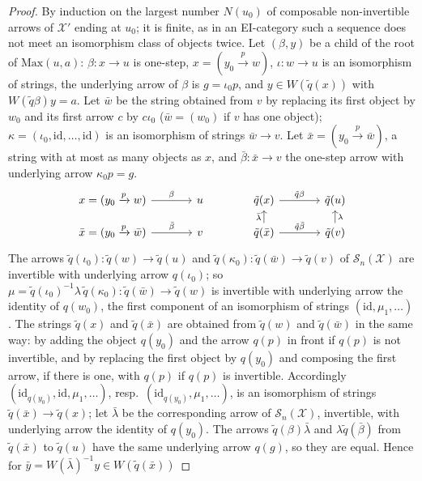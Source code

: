 \documentclass[11pt]{amsart}
\theoremstyle{definition}
\newcommand{\Max}{\mathrm{Max}}
\newcommand{\cX}{\mathcal X}
\newcommand{\cS}{\mathcal S}
\newcommand{\id}{\mathrm{id}}
\begin{document}
\begin{proof}
By induction on the largest number $N(u_0)$ of composable
non-invertible arrows of $\cX'$ ending at $u_0$; it is finite, as in
an EI-category such a sequence does not meet an isomorphism class of
objects twice. Let $(\beta,y)$ be a child of the root of $\Max(u,a)$:
$\beta\colon x\to u$ is one-step, $x=(y_0\xrightarrow{p}w)$,
$\iota\colon w\to u$ is an isomorphism of strings, the underlying
arrow of $\beta$ is $g=\iota_0p$, and $y\in W(\tilde q(x))$ with
$W(\tilde q\beta)y=a$. Let $\bar w$ be the string obtained from $v$ by
replacing its first object by $w_0$ and its first arrow $c$ by
$c\iota_0$ ($\bar w=(w_0)$ if $v$ has one object);
$\kappa=(\iota_0,\id,\dots,\id)$ is an isomorphism of strings $\bar
w\to v$. Let $\bar x=(y_0\xrightarrow{p}\bar w)$, a string with at
most as many objects as $x$, and $\bar\beta\colon\bar x\to v$ the
one-step arrow with underlying arrow $\kappa_0p=g$.
\[
\begin{tikzcd}[column sep=large,row sep=small]
x=(y_0\xrightarrow{p}w)\ar[r,"\beta"]&u&\tilde q(x)\ar[r,"\tilde
q\beta"]&\tilde q(u)\\
\bar x=(y_0\xrightarrow{p}\bar w)\ar[r,"\bar\beta"]&v&\tilde q(\bar
x)\ar[r,"\tilde q\bar\beta"]\ar[u,"\bar\lambda"]&\tilde
q(v)\ar[u,"\lambda"']
\end{tikzcd}
\]
The arrows $\tilde q(\iota_0)\colon\tilde q(w)\to\tilde q(u)$ and
$\tilde q(\kappa_0)\colon\tilde q(\bar w)\to\tilde q(v)$ of
$\cS_n(\cX)$ are invertible with underlying arrow $q(\iota_0)$; so
$\mu=\tilde q(\iota_0)^{-1}\lambda\,\tilde q(\kappa_0)\colon\tilde
q(\bar w)\to\tilde q(w)$ is invertible with underlying arrow the
identity of $q(w_0)$, the first component of an isomorphism of strings
$(\id,\mu_1,\dots)$. The strings $\tilde q(x)$ and $\tilde q(\bar x)$
are obtained from $\tilde q(w)$ and $\tilde q(\bar w)$ in the same
way: by adding the object $q(y_0)$ and the arrow $q(p)$ in front if
$q(p)$ is not invertible, and by replacing the first object by
$q(y_0)$ and composing the first arrow, if there is one, with $q(p)$
if $q(p)$ is invertible. Accordingly $(\id_{q(y_0)},\id,\mu_1,\dots)$,
resp.\ $(\id_{q(y_0)},\mu_1,\dots)$, is an isomorphism of strings
$\tilde q(\bar x)\to\tilde q(x)$; let $\bar\lambda$ be the
corresponding arrow of $\cS_n(\cX)$, invertible, with underlying arrow
the identity of $q(y_0)$. The arrows $\tilde q(\beta)\bar\lambda$ and
$\lambda\tilde q(\bar\beta)$ from $\tilde q(\bar x)$ to $\tilde q(u)$
have the same underlying arrow $q(g)$, so they are equal. Hence for
$\bar y=W(\bar\lambda)^{-1}y\in W(\tilde q(\bar x))$

\end{proof}
\end{document}
